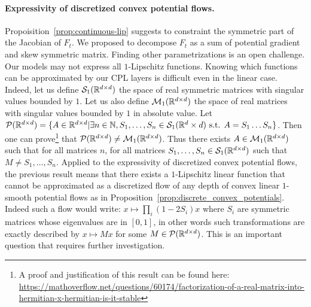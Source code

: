 \paragraph{Expressivity of discretized convex potential flows.}
Propoisition~\ref{prop:continuous-lip} suggests to constraint the symmetric part of the Jacobian of $F_t$. We proposed to decompose $F_t$ as a sum of potential gradient and skew symmetric matrix. Finding other parametrizations is an open challenge.
Our models may not express all $1$-Lipschitz functions.
Knowing which functions can be approximated by our CPL layers is difficult even in the linear case. Indeed, let us define $\mathcal{S}_1(\mathbb{R}^{d\times d})$ the space of real symmetric matrices with singular values bounded by $1$. Let us also define $\mathcal{M}_1(\mathbb{R}^{d\times d})$ the space of real matrices with singular values bounded by $1$ in absolute value.
Let $\mathcal{P}(\mathbb{R}^{d\times d})=\{A\in\mathbb{R}^{d\times d}|\exists n\in \mathbb{N},S_1,\dots,S_n\in \mathcal{S}_1(\mathbb{R}^d\times d)\text{ s.t. } A = S_1\dots S_n\}$. Then one can prove\footnote{A proof and justification of this result can be found here: \url{https://mathoverflow.net/questions/60174/factorization-of-a-real-matrix-into-hermitian-x-hermitian-is-it-stable}} that $\mathcal{P}(\mathbb{R}^{d\times d}) \neq \mathcal{M}_1(\mathbb{R}^{d\times d})$. Thus there exists $A\in\mathcal{M}_1(\mathbb{R}^{d\times d})$ such that for all matrices $n$, for all matrices $S_1,\dots,S_n\in\mathcal{S}_1(\mathbb{R}^{d\times d})$ such that $M\neq S_1,\dots,S_n$. Applied to the expressivity of discretized convex potential flows, the previous result means that there exists a $1$-Lipschitz linear function that cannot be approximated as a discretized flow of any depth of convex linear $1$-smooth potential flows as in Proposition~\ref{prop:discrete_convex_potentials}. Indeed such a flow would write: $x\mapsto\prod_i(1-2S_i)x$ where $S_i$ are symmetric matrices whose eigenvalues are in $[0,1]$, in other words such transformations are exactly described by $x\mapsto Mx$  for some $M\in\mathcal{P}(\mathbb{R}^{d\times d})$. This is  an important question that requires further investigation. 



